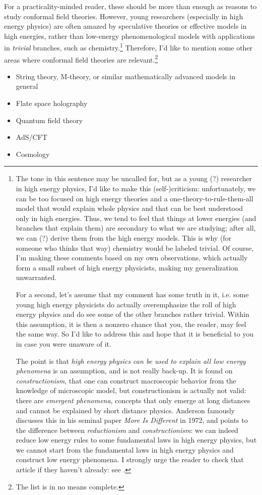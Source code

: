 \documentclass[12pt]{article}
\numberwithin{equation}{section}
\begin{document}
For a practicality-minded reader, these should be more than enough as reasons to study conformal field theories. However, young researchers (especially in high energy physics) are often amazed by speculative theories or effective models in high energies, rather than low-energy phenomenological models with applications in \emph{trivial} branches, such as chemistry.\footnote{
The tone in this sentence may be uncalled for, but as a young (?) researcher in high energy physics, I'd like to make this (self-)criticism: unfortunately, we can be too focused on high energy theories and a one-theory-to-rule-them-all model that would explain whole physics and that can be best understood only in high energies. Thus, we tend to feel that things at lower energies (and branches that explain them) are secondary to what we are studying; after all, we can (?) derive them from the high energy models. This is why (for someone who thinks that way) chemistry would be labeled trivial. Of course, I'm making these comments based on my own observations, which actually form a small subset of high energy physicists, making my generalization unwarranted.

For a second, let's assume that my comment has some truth in it, i.e. some young high energy physicists do actually overemphasize the roll of high energy physics and do see some of the other branches rather trivial. Within this assumption, it is then a nonzero chance that you, the reader, may feel the same way. So I'd like to address this and hope that it is beneficial to you in case you were unaware of it.

The point is that \emph{high energy physics can be used to explain all low energy phenomena} is an assumption, and is not really back-up. It is found on \emph{constructionism}, that one can construct macroscopic behavior from the knowledge of microscopic model, but constructionism is actually not valid: there are \emph{emergent phenomena}, concepts that only emerge at long distances and cannot be explained by short distance physics. Anderson famously discusses this in his seminal paper \emph{More Is Different} in 1972, and points to the difference between \emph{reductionism} and \emph{constructionism}: we can indeed reduce low energy rules to some fundamental laws in high energy physics, but we cannot start from the fundamental laws in high energy physics and construct low energy phenomena. I strongly urge the reader to check that article if they haven't already: see \cite{Anderson:1972pca}.
} Therefore, I'd like to mention some other areas where conformal field theories are relevant.\footnote{The list is in no means complete.}
\begin{itemize}
	\item String theory, M-theory, or similar mathematically advanced models in general
	\item Flate space holography
	\item Quantum field theory
	\item AdS/CFT
	\item Cosmology
\end{itemize}
\end{document}
